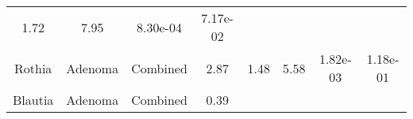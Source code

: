 \documentclass[12pt,]{article}
\begin{document}
\begin{longtable}[]{@{}cccccccc@{}}
\begin{minipage}[t]{0.14\columnwidth}
1.72\strut
\end{minipage} & \begin{minipage}[t]{0.14\columnwidth}\centering\strut
7.95\strut
\end{minipage} & \begin{minipage}[t]{0.06\columnwidth}\centering\strut
8.30e-04\strut
\end{minipage} & \begin{minipage}[t]{0.06\columnwidth}\centering\strut
7.17e-02\strut
\end{minipage}\tabularnewline
\begin{minipage}[t]{0.18\columnwidth}\centering\strut
Rothia\strut
\end{minipage} & \begin{minipage}[t]{0.07\columnwidth}\centering\strut
Adenoma\strut
\end{minipage} & \begin{minipage}[t]{0.09\columnwidth}\centering\strut
Combined\strut
\end{minipage} & \begin{minipage}[t]{0.03\columnwidth}\centering\strut
2.87\strut
\end{minipage} & \begin{minipage}[t]{0.14\columnwidth}\centering\strut
1.48\strut
\end{minipage} & \begin{minipage}[t]{0.14\columnwidth}\centering\strut
5.58\strut
\end{minipage} & \begin{minipage}[t]{0.06\columnwidth}\centering\strut
1.82e-03\strut
\end{minipage} & \begin{minipage}[t]{0.06\columnwidth}\centering\strut
1.18e-01\strut
\end{minipage}\tabularnewline
\begin{minipage}[t]{0.18\columnwidth}\centering\strut
Blautia\strut
\end{minipage} & \begin{minipage}[t]{0.07\columnwidth}\centering\strut
Adenoma\strut
\end{minipage} & \begin{minipage}[t]{0.09\columnwidth}\centering\strut
Combined\strut
\end{minipage} & \begin{minipage}[t]{0.03\columnwidth}\centering\strut
0.39\strut
\end{minipage} & \begin{minipage}[t]{0.14\columnwidth}\centering\strut

\end{minipage}
\end{longtable}
\end{document}
